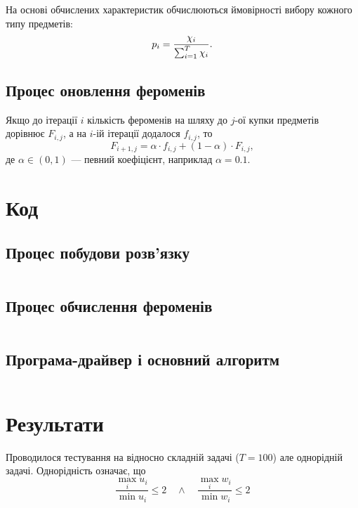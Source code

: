 \documentclass[a4paper, 12pt]{article}
\numberwithin{equation}{section}
\begin{document}
На основі обчислених характеристик обчислюються ймовірності вибору кожного типу предметів:
\begin{equation}
    p_i = \frac{\chi_i}{\operatorname*{\sum}_{i = 1}^T \chi_i}.
\end{equation}

\subsection{Процес оновлення фероменів}

Якщо до ітерації $i$ кількість фероменів на шляху до $j$-ої купки предметів дорівнює $F_{i,j}$, а на $i$-ій ітерації додалося $f_{i,j}$, то
\begin{equation}
    F_{i+1,j} = \alpha \cdot f_{i, j} + (1 - \alpha) \cdot F_{i, j},
\end{equation}
де $\alpha \in (0, 1)$ --- певний коефіцієнт, наприклад $\alpha = 0.1$.

\section{Код}

\subsection{Процес побудови розв'язку}

\inputminted{python}{../../code/knapsack/generate_solution.py}

\subsection{Процес обчислення фероменів}

\inputminted{python}{../../code/knapsack/calculate_feroments.py}

\subsection{Програма-драйвер і основний алгоритм}

\inputminted{python}{../../code/knapsack/knapsack.py}

\section{Результати}

Проводилося тестування на відносно складній задачі ($T = 100$) але однорідній задачі. Однорідність означає, що
\begin{equation}
    \frac{\max_i u_i}{\min u_i} \le 2 \quad \land \quad \frac{\max_i w_i}{\min w_i} \le 2
\end{equation}
\end{document}
